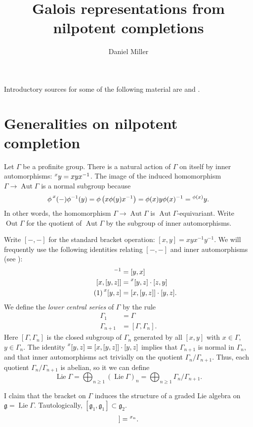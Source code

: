 \documentclass{article}
\title{Galois representations from nilpotent completions}
\author{Daniel Miller}
\DeclareMathOperator{\aut}{Aut}
\DeclareMathOperator{\lie}{Lie}
\DeclareMathOperator{\out}{Out}
\newcommand{\conj}[2]{\prescript{#1}{}{#2}}
\newcommand{\fg}{\mathfrak{g}}
\begin{document}
\maketitle





Introductory sources for some of the following material are 
\cite{kkl98} and \cite{ih91}. 





\section{Generalities on nilpotent completion}

Let $\Gamma$ be a profinite group. There is a natural action of $\Gamma$ on 
itself by inner automorphisms: $\conj x y = x y x^{-1}$. The image of the 
induced homomorphism $\Gamma \to \aut\Gamma$ is a normal subgroup because 
\[
  \phi \conj{x}{(-)} \phi^{-1}(y) 
    = \phi\left( x \phi(y) x^{-1}\right) 
    = \phi(x) y \phi(x)^{-1} 
    = \conj{\phi(x)} y .
\]
In other words, the homomorphism $\Gamma \to \aut\Gamma$ is 
$\aut\Gamma$-equivariant. Write $\out\Gamma$ for the quotient of $\aut\Gamma$ 
by the subgroup of inner automorphisms. 

Write $[-,-]$ for the standard bracket operation: $[x,y] = x y x^{-1} y^{-1}$. 
We will frequently use the following identities relating $[-,-]$ and inner 
automorphisms (see \cite[10.2]{ha76}): 
\begin{align*}
  [x,y]^{-1} &= [y,x] \\
  [x,[y,z]] &= \conj{x}{[y,z]}\cdot [z,y] \\ \tag{1}\label{g}
  \conj x{[y,z]} &=  [x,[y,z]]\cdot [y,z] .
\end{align*}
We define the \emph{lower central series} of $\Gamma$ by the rule 
\begin{align*}
  \Gamma_1 &= \Gamma \\
  \Gamma_{n+1} &= [\Gamma,\Gamma_n] .
\end{align*}
Here $[\Gamma,\Gamma_n]$ is the closed subgroup of $\Gamma_n$ generated by 
all $[x,y]$ with $x\in \Gamma$, $y\in \Gamma_n$. The identity 
$\conj{x}{[y,z]} = [x,[y,z]]\cdot [y,z]$ implies that $\Gamma_{n+1}$ is normal 
in $\Gamma_n$, and that inner automorphisms act trivially on the quotient 
$\Gamma_n / \Gamma_{n+1}$. Thus, each quotient $\Gamma_n/\Gamma_{n+1}$ is 
abelian, so it we can define  
\[
  \lie\Gamma = \bigoplus_{n\geqslant 1} (\lie \Gamma)_n = \bigoplus_{n\geqslant 1} \Gamma_n / \Gamma_{n+1} .
\]

I claim that the bracket on $\Gamma$ induces the structure of a graded Lie 
algebra on $\fg = \lie\Gamma$. Tautologically, $[\fg_1,\fg_1]\subset \fg_2$. 
\begin{align*}
  [x_n, [y_m, z_m]] = \conj{x_n}{.}
\end{align*}







\end{document}
